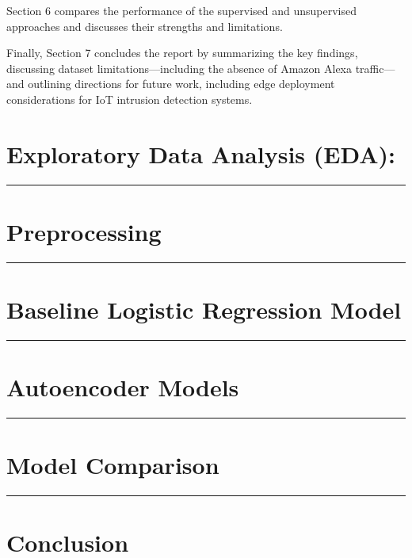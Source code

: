 \documentclass[
  8pt,
  letterpaper,
  DIV=11,
  numbers=noendperiod]{scrreprt}
\begin{document}
Section 6 compares the performance of the supervised and unsupervised
approaches and discusses their strengths and limitations.

Finally, Section 7 concludes the report by summarizing the key findings,
discussing dataset limitations---including the absence of Amazon Alexa
traffic---and outlining directions for future work, including edge
deployment considerations for IoT intrusion detection systems.


\chapter{Exploratory Data Analysis
(EDA):}\label{exploratory-data-analysis-eda}

\begin{center}\rule{0.5\linewidth}{0.5pt}\end{center}


\chapter{Preprocessing}\label{preprocessing}

\begin{center}\rule{0.5\linewidth}{0.5pt}\end{center}


\chapter{Baseline Logistic Regression
Model}\label{baseline-logistic-regression-model}

\begin{center}\rule{0.5\linewidth}{0.5pt}\end{center}


\chapter{Autoencoder Models}\label{autoencoder-models}

\begin{center}\rule{0.5\linewidth}{0.5pt}\end{center}


\chapter{Model Comparison}\label{model-comparison}

\begin{center}\rule{0.5\linewidth}{0.5pt}\end{center}


\chapter{Conclusion}\label{conclusion}
\end{document}
